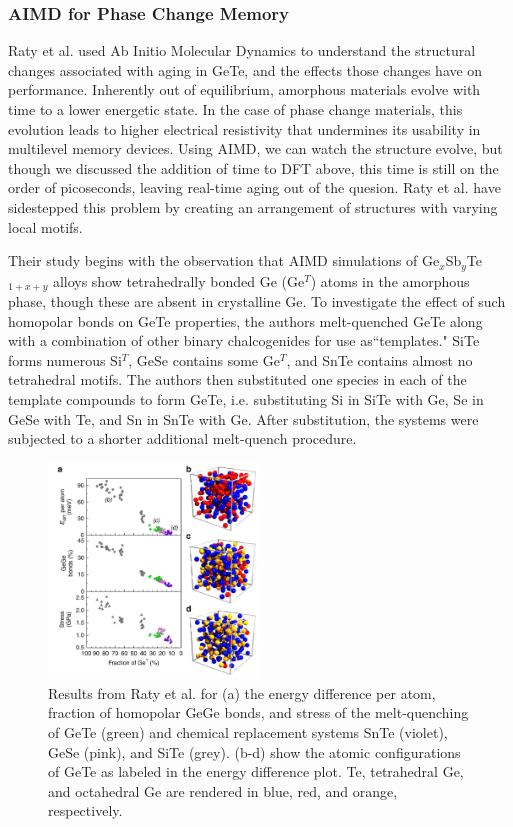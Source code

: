 \documentclass[3p,review,12pt]{elsarticle}
\begin{document}
\subsubsection{AIMD for Phase Change Memory}
Raty et al. \cite{Raty2015} used Ab Initio Molecular Dynamics to understand the structural changes associated with aging in GeTe, and the effects those changes have on performance. Inherently out of equilibrium, amorphous materials evolve with time to a lower energetic state. In the case of phase change materials, this evolution leads to higher electrical resistivity that undermines its usability in multilevel memory devices. Using AIMD, we can watch the structure evolve, but though we discussed the addition of time to DFT above, this time is still on the order of picoseconds, leaving real-time aging out of the quesion. Raty et al. have sidestepped this problem by creating an arrangement of structures with varying local motifs. 
\par
Their study begins with the observation that AIMD simulations of Ge$_{x}$Sb$_{y}$Te$_{1+x+y}$ alloys show tetrahedrally bonded Ge (Ge$^{T}$) atoms in the amorphous phase, though these are absent in crystalline Ge. To investigate the effect of such homopolar bonds on GeTe properties, the authors melt-quenched GeTe along with a combination of other binary chalcogenides for use as``templates." SiTe forms numerous Si$^{T}$, GeSe contains some Ge$^{T}$, and SnTe contains almost no tetrahedral motifs.  The authors then substituted one species in each of the template compounds to form GeTe, i.e. substituting Si in SiTe with Ge, Se in GeSe with Te, and Sn in SnTe with Ge. After substitution, the systems were subjected to a shorter additional melt-quench procedure.
\begin{figure}[h]
	\includegraphics[width=0.5\textwidth]{raty1}
	\centering
	\caption{Results from Raty et al. \cite{Raty2015} for (a) the energy difference per atom, fraction of homopolar GeGe bonds, and stress of the melt-quenching of GeTe (green) and chemical replacement systems SnTe (violet), GeSe (pink), and SiTe (grey). (b-d) show the atomic configurations of GeTe as labeled in the energy difference plot. Te, tetrahedral Ge, and octahedral Ge are rendered in blue, red, and orange, respectively.} 
\end{figure}
\end{document}
